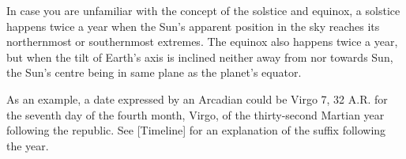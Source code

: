 In case you are unfamiliar with the concept of the solstice and equinox, a solstice happens twice a year when the Sun's apparent position in the sky reaches its northernmost or southernmost extremes. The equinox also happens twice a year, but when the tilt of Earth's axis is inclined neither away from nor towards Sun, the Sun's centre being in same plane as the planet's equator.

As an example, a date expressed by an Arcadian could be Virgo 7, 32 A.R. for the seventh day of the fourth month, Virgo, of the thirty-second Martian year following the republic. See [Timeline] for an explanation of the suffix following the year.

